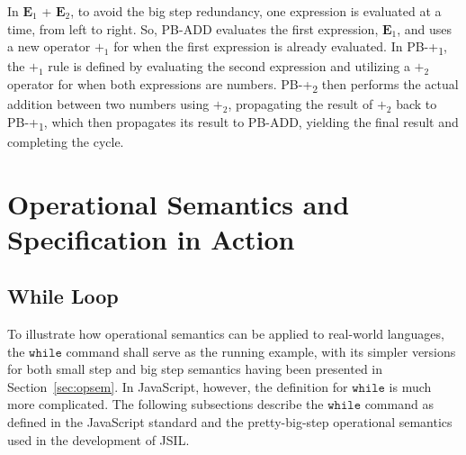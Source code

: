 \documentclass[a4paper,11pt,twoside]{report}
\begin{document}
In $\mathbf{E}_1$ + $\mathbf{E}_2$, to avoid the big step redundancy, one expression is evaluated at a time, from left to right. So, PB-ADD evaluates the first expression, $\mathbf{E}_1$, and uses a new operator $+_1$ for when the first expression is already evaluated. In PB-+\textsubscript{1}, the $+_1$ rule is defined by evaluating the second expression and utilizing a $+_2$ operator for when both expressions are numbers. PB-+\textsubscript{2} then performs the actual addition between two numbers using $+_2$, propagating the result of $+_2$ back to PB-+\textsubscript{1}, which then propagates its result to PB-ADD, yielding the final result and completing the cycle. 

\section{Operational Semantics and Specification in Action}\label{sec:opsemac}
\subsection{While Loop}
To illustrate how operational semantics can be applied to real-world languages, the $\mathtt{while}$ command shall serve as the running example, with its simpler versions for both small step and big step semantics having been presented in Section~\ref{sec:opsem}. In JavaScript, however, the definition for $\mathtt{while}$ is much more complicated. The following subsections describe the $\mathtt{while}$ command as defined in the JavaScript standard and the pretty-big-step operational semantics used in the development of JSIL.
\end{document}
